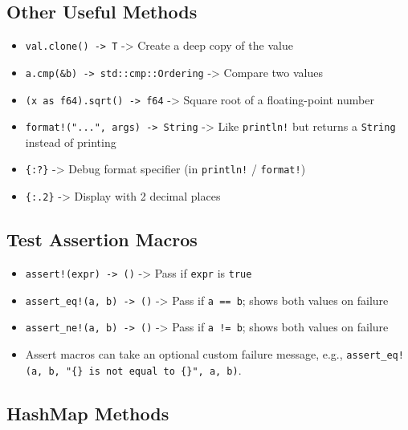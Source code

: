 \documentclass[
  11pt,
]{article}
\providecommand{\tightlist}{%
  \setlength{\itemsep}{0pt}\setlength{\parskip}{0pt}}
\begin{document}
\subsection{Other Useful Methods}\label{other-useful-methods}

\begin{itemize}
\tightlist
\item
  \texttt{val.clone()\ -\textgreater{}\ T} -\textgreater{} Create a deep
  copy of the value
\item
  \texttt{a.cmp(\&b)\ -\textgreater{}\ std::cmp::Ordering}
  -\textgreater{} Compare two values
\item
  \texttt{(x\ as\ f64).sqrt()\ -\textgreater{}\ f64} -\textgreater{}
  Square root of a floating-point number
\item
  \texttt{format!("...",\ args)\ -\textgreater{}\ String}
  -\textgreater{} Like \texttt{println!} but returns a \texttt{String}
  instead of printing
\item
  \texttt{\{:?\}} -\textgreater{} Debug format specifier (in
  \texttt{println!} / \texttt{format!})
\item
  \texttt{\{:.2\}} -\textgreater{} Display with 2 decimal places
\end{itemize}

\subsection{Test Assertion Macros}\label{test-assertion-macros}

\begin{itemize}
\tightlist
\item
  \texttt{assert!(expr)\ -\textgreater{}\ ()} -\textgreater{} Pass if
  \texttt{expr} is \texttt{true}
\item
  \texttt{assert\_eq!(a,\ b)\ -\textgreater{}\ ()} -\textgreater{} Pass
  if \texttt{a\ ==\ b}; shows both values on failure
\item
  \texttt{assert\_ne!(a,\ b)\ -\textgreater{}\ ()} -\textgreater{} Pass
  if \texttt{a\ !=\ b}; shows both values on failure
\item
  Assert macros can take an optional custom failure message, e.g.,
  \texttt{assert\_eq!(a,\ b,\ "\{\}\ is\ not\ equal\ to\ \{\}",\ a,\ b)}.
\end{itemize}

\subsection{HashMap Methods}\label{hashmap-methods}
\end{document}
